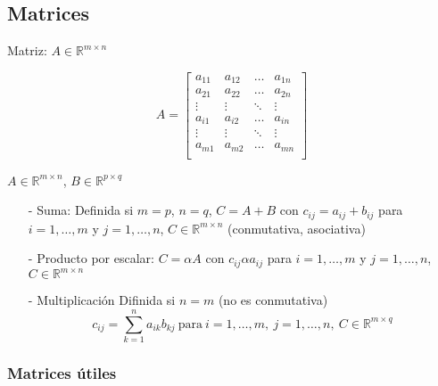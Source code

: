 \subsection{Matrices}
\label{subsec:matrices}

Matriz: $A \in \mathbb{R}^{m \times n}$

\[
A = 
\begin{bmatrix}
a_{11} & a_{12} & \ldots & a_{1n} \\
a_{21} & a_{22} & \ldots & a_{2n} \\
\vdots & \vdots & \ddots & \vdots \\
a_{i1} & a_{i2} & \ldots & a_{in} \\
\vdots & \vdots & \ddots & \vdots \\
a_{m1} & a_{m2} & \ldots & a_{mn} \\
\end{bmatrix}
\]

\noindent $A \in \mathbb{R}^{m \times n}$, $B \in \mathbb{R}^{p \times q}$

\begin{itemize}
    \item[-] Suma: Definida si $m = p$, $n= q$, $C = A + B$ con $c_{ij} = a_{ij} + b_{ij}$ para $i= 1,\ldots, m$ y $j = 1,\ldots,n$, $C \in \mathbb{R}^{m \times n}$ (conmutativa, asociativa)
    \item[-] Producto por escalar:
    $C = \alpha A$ con $c_{ij} \alpha a_{ij}$ para $i= 1,\ldots, m$ y $j = 1,\ldots,n$, $C\in \mathbb{R}^{m \times n}$
    \item[-] Multiplicación Difinida si $n = m$ (no es conmutativa)
    \[c_{ij} = \sum_{k = 1}^{n} a_{ik}b_{kj} ~\text{para}~ i= 1,\ldots, m, ~j = 1,\ldots,n ,~ C \in \mathbb{R}^{m \times q}\]
\end{itemize}

\subsubsection{Matrices útiles}
\label{subsubsec:matrices_utiles}

